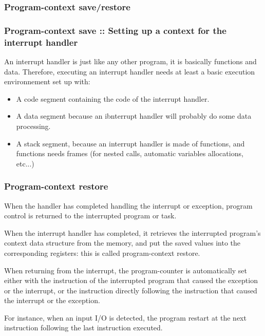 
\begin{frame}
  \frametitle{Program-context save/restore}

 \begin{center}
  \end{center}

\end{frame}


\begin{frame}
  \frametitle{Program-context save :: Setting up a context for the interrupt handler}

An interrupt handler is just like any other program, it is basically functions and data. Therefore, executing an interrupt handler needs at least a basic execution environnement set up with:

   \begin{itemize}
   \item
   A code segment containing the code of the interrupt handler.
   \item
   A data segment because an ibnterrupt handler will probably do some data processing.
   \item
   A stack segment, because an interrupt handler is made of functions, and functions needs frames (for nested calls, automatic variables allocations, etc...)
   \end{itemize}

\end{frame}


\begin{frame}
  \frametitle{Program-context restore}

When the handler has completed handling the interrupt or exception, program control is returned to the interrupted program or task.

\-

When the interrupt handler has completed, it retrieves the interrupted program's context data structure from the memory, and put the saved values into the corresponding registers: this is called program-context restore.

\-

When returning from the interrupt, the program-counter is automatically set either with the instruction of the interrupted program that caused the exception or the interrupt, or the instruction directly following the instruction that caused the interrupt or the exception.

\-

For instance, when an input I/O is detected, the program restart at the next instruction following the last instruction executed.

\end{frame}

